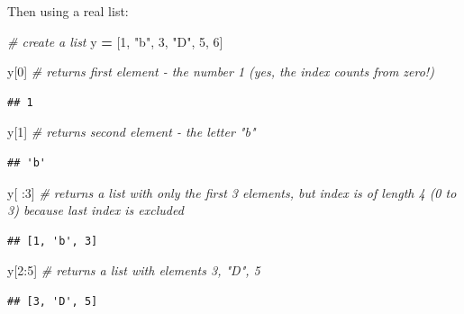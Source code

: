 \documentclass[
]{book}
\newenvironment{Shaded}{\begin{snugshade}}{\end{snugshade}}
\newcommand{\CommentTok}[1]{\textcolor[rgb]{0.56,0.35,0.01}{\textit{#1}}}
\newcommand{\DecValTok}[1]{\textcolor[rgb]{0.00,0.00,0.81}{#1}}
\newcommand{\NormalTok}[1]{#1}
\newcommand{\OperatorTok}[1]{\textcolor[rgb]{0.81,0.36,0.00}{\textbf{#1}}}
\newcommand{\StringTok}[1]{\textcolor[rgb]{0.31,0.60,0.02}{#1}}
\begin{document}
Then using a real list:

\begin{Shaded}
\begin{Highlighting}[]
\CommentTok{\# create a list}
\NormalTok{y }\OperatorTok{=}\NormalTok{ [}\DecValTok{1}\NormalTok{, }\StringTok{"b"}\NormalTok{, }\DecValTok{3}\NormalTok{, }\StringTok{"D"}\NormalTok{, }\DecValTok{5}\NormalTok{, }\DecValTok{6}\NormalTok{]}

\NormalTok{y[}\DecValTok{0}\NormalTok{] }\CommentTok{\# returns first element {-} the number 1 (yes, the index counts from zero!)}
\end{Highlighting}
\end{Shaded}

\begin{verbatim}
## 1
\end{verbatim}

\begin{Shaded}
\begin{Highlighting}[]
\NormalTok{y[}\DecValTok{1}\NormalTok{] }\CommentTok{\# returns second element {-} the letter "b"}
\end{Highlighting}
\end{Shaded}

\begin{verbatim}
## 'b'
\end{verbatim}

\begin{Shaded}
\begin{Highlighting}[]
\NormalTok{y[ :}\DecValTok{3}\NormalTok{] }\CommentTok{\# returns a list with only the first 3 elements, but index is of length 4 (0 to 3) because last index is excluded}
\end{Highlighting}
\end{Shaded}

\begin{verbatim}
## [1, 'b', 3]
\end{verbatim}

\begin{Shaded}
\begin{Highlighting}[]
\NormalTok{y[}\DecValTok{2}\NormalTok{:}\DecValTok{5}\NormalTok{] }\CommentTok{\# returns a list with elements 3, "D", 5}
\end{Highlighting}
\end{Shaded}

\begin{verbatim}
## [3, 'D', 5]
\end{verbatim}
\end{document}
